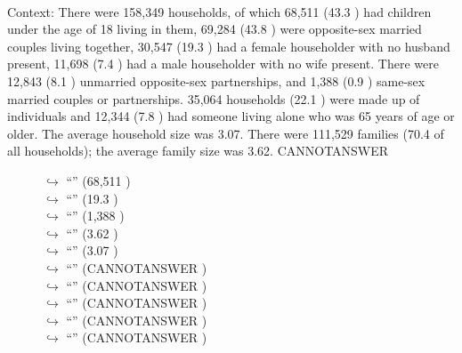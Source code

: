 \documentclass[11pt,a4paper, onecolumn]{article}
\begin{document}
\\ Context: There were 158,349 households, of which 68,511 (43.3 ) had children under the age of 18 living in them, 69,284 (43.8 ) were opposite-sex married couples living together, 30,547 (19.3 ) had a female householder with no husband present, 11,698 (7.4 ) had a male householder with no wife present. There were 12,843 (8.1 ) unmarried opposite-sex partnerships, and 1,388 (0.9 ) same-sex married couples or partnerships. 35,064 households (22.1 ) were made up of individuals and 12,344 (7.8 ) had someone living alone who was 65 years of age or older. The average household size was 3.07. There were 111,529 families (70.4  of all households); the average family size was 3.62. CANNOTANSWER

\begin{figure}[t] \small \begin{tcolorbox}[boxsep=0pt,left=5pt,right=0pt,top=2pt,colback = yellow!5] \begin{dialogue}
 \small 
\colorbox{pink!25}{$\hookrightarrow$}
{ ``'' (68,511 ) }
\\
\colorbox{pink!25}{$\hookrightarrow$}
{ ``'' (19.3  ) }
\\
\colorbox{pink!25}{$\hookrightarrow$}
{ ``'' (1,388 ) }
\\
\colorbox{pink!25}{$\hookrightarrow$}
{ ``'' (3.62 ) }
\\
\colorbox{pink!25}{$\hookrightarrow$}
{ ``'' (3.07 ) }
\\
\colorbox{pink!25}{$\hookrightarrow$}
{ ``'' (CANNOTANSWER ) }
\\
\colorbox{pink!25}{$\hookrightarrow$}
{ ``'' (CANNOTANSWER ) }
\\
\colorbox{pink!25}{$\hookrightarrow$}
{ ``'' (CANNOTANSWER ) }
\\
\colorbox{pink!25}{$\hookrightarrow$}
{ ``'' (CANNOTANSWER ) }
\\
\colorbox{pink!25}{$\hookrightarrow$}
{ ``'' (CANNOTANSWER ) }
\\
 \end{dialogue}\end{tcolorbox}\end{figure}
\end{document}
